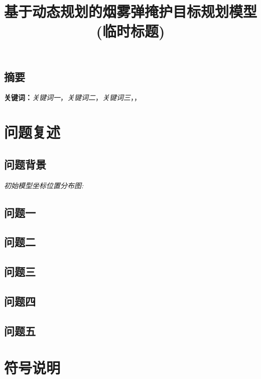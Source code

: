 \documentclass{article}
\title{\large 基于动态规划的烟雾弹掩护目标规划模型(临时标题)}
\date{}
\begin{document}
\maketitle
\begin{center}
\section*{摘要}
\end{center}
\vspace{-1em}


\noindent


\noindent
\textbf{关键词：}\textit{关键词一}，\textit{关键词二}，\textit{关键词三}，\textit{}，\textit{}



\section{问题复述}

\subsection{问题背景}

\textit{初始模型坐标位置分布图:}

\subsection{问题一}

\subsection{问题二}

\subsection{问题三}

\subsection{问题四}

\subsection{问题五}

\section{符号说明}
\end{document}
